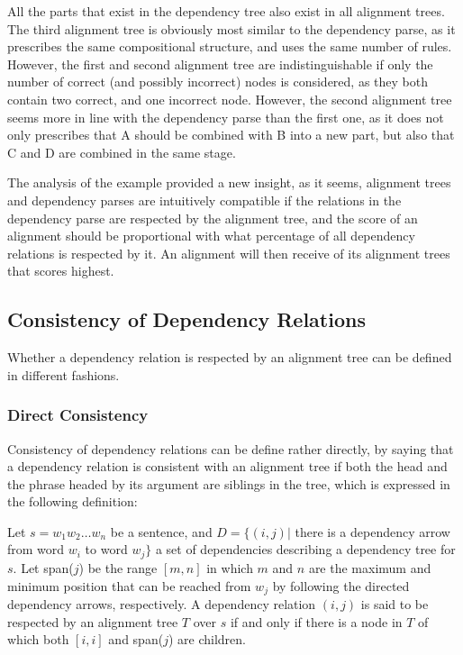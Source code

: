 \documentclass{report}
\begin{document}
All the parts that exist in the dependency tree also exist in all alignment trees. The third alignment tree is obviously most similar to the dependency parse, as it prescribes the same compositional structure, and uses the same number of rules. However, the first and second alignment tree are indistinguishable if only the number of correct (and possibly incorrect) nodes is considered, as they both contain two correct, and one incorrect node. However, the second alignment tree seems more in line with the dependency parse than the first one, as it does not only prescribes that A should be combined with B into a new part, but also that C and D are combined in the same stage.

The analysis of the example provided a new insight, as it seems, alignment trees and dependency parses are intuitively compatible if the relations in the dependency parse are respected by the alignment tree, and the score of an alignment should be proportional with what percentage of all dependency relations is respected by it. An alignment will then receive of its alignment trees that scores highest.

\subsection{Consistency of Dependency Relations}

Whether a dependency relation is respected by an alignment tree can be defined in different fashions.

\subsubsection{Direct Consistency}

Consistency of dependency relations can be define rather directly, by saying that a dependency relation is consistent with an alignment tree if both the head and the phrase headed by its argument are siblings in the tree, which is expressed in the following definition:

\begin{definition}\label{def:depHAT}
Let $s = w_1 w_2 \dots w_n$ be a sentence, and $D = \{ (i,j) |$ there is a dependency arrow from word $w_i$ to word $w_j \}$ a set of dependencies describing a dependency tree for $s$. Let span($j$) be the range $[m,n]$ in which $m$ and $n$ are the maximum and minimum position that can be reached from $w_j$ by following the directed dependency arrows, respectively. A dependency relation $(i,j)$ is said to be respected by an alignment tree $T$ over $s$ if and only if there is a node in $T$ of which both $[i,i]$ and span($j$) are children.
\end{definition}
\end{document}
